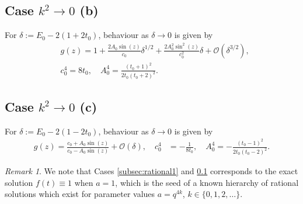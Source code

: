 \documentclass[reqno,a4paper]{amsart}
\numberwithin{equation}{section}
\theoremstyle{plain}
\theoremstyle{remark}
\newtheorem{remark}[theorem]{Remark}
\begin{document}
\subsection{Case $k^2\to0$ (b)}\label{subsec:rational} For $\delta:=E_0-2(1+2t_0)$, behaviour as $\delta\to0$ is given by
\begin{align*}
    &g(z)=1+\frac{2A_0\sin(z)}{c_0}\delta^{1/2}+\frac{2A_0^2\sin^2(z)}{c_0^2}\delta+\mathcal{O}\left(\delta^{3/2}\right),\\
    &c_0^4=8t_0,\quad A_0^4=\frac{(t_0+1)^2}{2t_0(t_0+2)^2}.
\end{align*}
\subsection{Case $k^2\to0$ (c)} For $\delta:=E_0-2(1-2t_0)$, behaviour as $\delta\to0$ is given by
\begin{align*}
    g(z)=\frac{c_0+A_0\sin(z)}{c_0-A_0\sin(z)}+\mathcal{O}(\delta),\quad c_0^4&=-\frac{1}{8t_0},\quad A_0^4=-\frac{(t_0-1)^2}{2t_0(t_0-2)^2}.
\end{align*}
\begin{remark}
    We note that Cases \ref{subsec:rational1} and \ref{subsec:rational} corresponds to the exact solution $f(t)\equiv1$ when $a=1$, which is the seed of a known hierarchy of rational solutions which exist for parameter values $a=q^{4k}$, $k\in\{0,1,2,\dots\}$.
\end{remark}
\printbibliography
\end{document}
